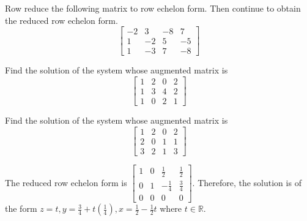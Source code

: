 \documentclass{ximera}
\begin{document}
\begin{problem}\label{prb:2.24} Row reduce the following matrix to row echelon form. Then continue to obtain the reduced row echelon form.
\begin{equation*}
\left[
\begin{array}{rrrr}
-2 & 3 & -8 & 7 \\
1 & -2 & 5 & -5 \\
1 & -3 & 7 & -8
\end{array}
\right]
\end{equation*}
\end{problem}

\begin{problem}\label{prb:2.25} Find the solution of the system whose augmented matrix is
\begin{equation*}
\left[
\begin{array}{rrr|r}
1 & 2 & 0 & 2 \\
1 & 3 & 4 & 2 \\
1 & 0 & 2 & 1
\end{array}
\right]
\end{equation*}
\end{problem}

\begin{problem}\label{prb:2.26} Find the solution of the system whose augmented matrix is
\begin{equation*}
\left[
\begin{array}{rrr|r}
1 & 2 & 0 & 2 \\
2 & 0 & 1 & 1 \\
3 & 2 & 1 & 3
\end{array}
\right]
\end{equation*}
\begin{hint}
The reduced row echelon form is $\left[
\begin{array}{rrr|r}
1 & 0 &  \frac{1}{2} &  \frac{1}{2} \\
0 & 1 & - \frac{1}{4} &  \frac{3}{4} \\
0 & 0 & 0 & 0
\end{array}
\right] .$ Therefore, the solution is of the form $z=t,y=\frac{3}{4}+t\left(
\frac{1}{4}\right) ,x=\frac{1}{2}-\frac{1}{2}t$ where $t\in \mathbb{R}$.
\end{hint}
\end{problem}
\end{document}
